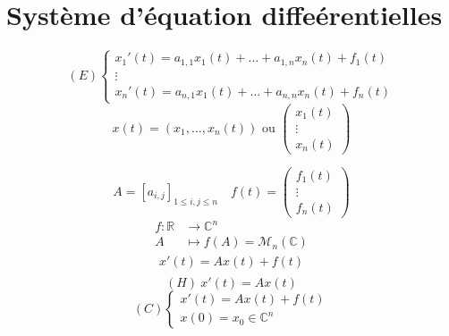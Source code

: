 \documentclass[a4paper]{report}
\newcommand\R{\ensuremath{\mathbb{R}}}
\theoremstyle{definition}
\begin{document}
\chapter{Système d'équation diffeérentielles}
\[
    (E) 
    \begin{cases}
        x_1'(t) = a_{1,1}x_1(t) + \ldots + a_{1,n}x_n(t) + f_1(t)\\
        \vdots\\
        x_n'(t) = a_{n,1}x_1(t) + \ldots + a_{n,n}x_n(t) + f_n(t)
    \end{cases}
\] 
\[
x(t) = (x_1, \ldots, x_n(t)) \text{ ou } \begin{pmatrix} x_1(t) \\ \vdots \\ x_n(t) \end{pmatrix} 
\] 

\[
    A = [a_{i,j}]_{1 \le i, j \le n} \quad f(t) = \begin{pmatrix} f_1(t) \\ \vdots \\ f_n(t) \end{pmatrix} 
\] 
\begin{align*}
    f: \R &\longrightarrow \mathbb{C}^n \\
    A &\longmapsto f(A) = \mathcal{M}_n(\mathbb{C})
\end{align*}
\begin{align*}
    x'(t) = Ax(t) + f(t)\\
\end{align*}
\[
    (H) \: x'(t) = Ax(t)
\] 
\[
    (C) \begin{cases}
        x'(t) = Ax(t) + f(t)\\
        x(0) = x_0 \in \mathbb{C}^n
    \end{cases}
\] 
\end{document}
